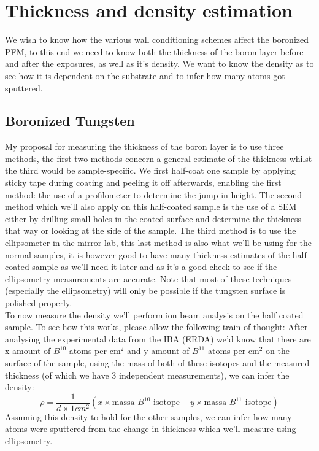 \documentclass{article}
\begin{document}
\section{Thickness and density estimation}
We wish to know how the various wall conditioning schemes affect the boronized PFM, to
this end we need to know both the thickness of the boron layer before and after the
exposures, as well as it's density.  We want to know the density as to see how
it is dependent on the substrate and to infer how many atoms got sputtered.
\subsection{Boronized Tungsten}
My proposal for measuring the thickness
of the boron layer is to use three methods, the first two methods concern a
general estimate of the thickness whilst the third would be sample-specific.
We first half-coat one sample by applying sticky tape during coating and
peeling it off afterwards, enabling the first method: the use of a profilometer
to determine the jump in height. The second method which we'll also apply on
this half-coated sample is the use of a SEM either by drilling small holes in
the coated surface and determine the thickness that way or looking at the side
of the sample.  The third method is to use the ellipsometer in the mirror lab,
this last method is also what we'll be using for the normal samples, it is
however good to have many thickness estimates of the half-coated sample as
we'll need it later and as it's a good check to see if the ellipsometry
measurements are accurate.  Note that most of these techniques (especially the
ellipsometry) will only be possible if the tungsten surface is polished properly.
 \vspace{0.2cm} \\
To now measure the density we'll perform ion beam analysis on the half coated
sample. To see how this works, please allow the following train of thought: After
analysing the experimental data from the IBA (ERDA) we'd know that there are x amount
of $B^{10}$ atoms per cm$^2$ and y amount of $B^{11}$ atoms per cm$^2$ on the
surface of the sample, using the mass of both of these isotopes and the
measured thickness (of which we have 3 independent measurements), we can infer
the density:
\begin{equation}
    \rho = \frac{1}{d \times 1 cm^2} \left( x \times \text{massa }B^{10}   \text{ isotope} + y \times \text{massa }B^{11}   \text{ isotope}\right)
\end{equation}
Assuming this density to hold for the other samples, we can infer how many atoms 
were sputtered from the change in thickness which we'll measure using ellipsometry.
\end{document}
